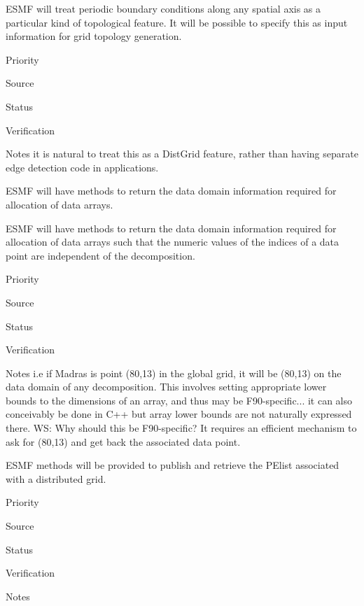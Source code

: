
ESMF will treat periodic boundary conditions along any spatial axis as
a particular kind of topological feature. It will be possible to
specify this as input information for grid topology generation.

\begin{reqlist}
\item[Priority]
\item[Source]
\item[Status]
\item[Verification]
\item[Notes] it is natural to treat this as a DistGrid feature, rather
  than having separate edge detection code in applications.
\end{reqlist}


ESMF will have methods to return the data domain information required
for allocation of data arrays.


ESMF will have methods to return the data domain information required
for allocation of data arrays such that the numeric values of the
indices of a data point are independent of the decomposition.

\begin{reqlist}
\item[Priority]
\item[Source]
\item[Status]
\item[Verification]
\item[Notes] i.e if Madras is point (80,13) in the global grid, it
  will be (80,13) on the data domain of any decomposition. This
  involves setting appropriate lower bounds to the dimensions of an
  array, and thus may be F90-specific... it can also conceivably be
  done in C++ but array lower bounds are not naturally expressed
  there.  WS: Why should this be F90-specific?  
  It requires an efficient mechanism to ask for (80,13) and get 
  back the associated data point.
\end{reqlist}



ESMF methods will be provided to publish and retrieve the PElist
associated with a distributed grid.

\begin{reqlist}
\item[Priority]
\item[Source]
\item[Status]
\item[Verification]
\item[Notes]
\end{reqlist}

